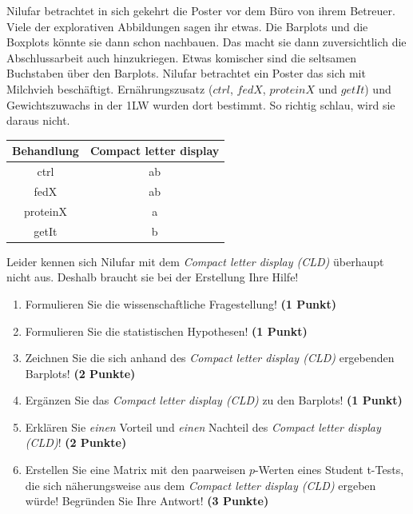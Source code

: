 \documentclass[a4paper, 9pt]{scrartcl}\usepackage[]{graphicx}\usepackage[]{xcolor}
\newenvironment{knitrout}{}{} %
\begin{document}
Nilufar betrachtet in sich gekehrt die Poster vor dem Büro von ihrem Betreuer. Viele der explorativen Abbildungen sagen ihr etwas. Die Barplots und die Boxplots könnte sie dann schon nachbauen. Das macht sie dann zuversichtlich die Abschlussarbeit auch hinzukriegen. Etwas komischer sind die seltsamen Buchstaben über den Barplots. Nilufar betrachtet ein Poster das sich mit Milchvieh beschäftigt. Ernährungszusatz ($ctrl$, $fedX$, $proteinX$ und $getIt$) und Gewichtszuwachs in der 1LW wurden dort bestimmt. So richtig schlau, wird sie daraus nicht.

\begin{knitrout}
\color{fgcolor}\begin{table}[!h]
\centering\begingroup\fontsize{10}{12}\selectfont

\begin{tabular}{cc}
\toprule
\textbf{Behandlung} & \textbf{Compact letter display}\\
\midrule
ctrl & ab\\
fedX & ab\\
proteinX & a\\
getIt & b\\
\bottomrule
\end{tabular}
\endgroup{}
\end{table}

\end{knitrout}

Leider kennen sich Nilufar mit dem \textit{Compact letter display (CLD)} überhaupt nicht aus. Deshalb braucht sie bei der Erstellung Ihre Hilfe!

\begin{enumerate}
  \item Formulieren Sie die wissenschaftliche Fragestellung! \textbf{(1 Punkt)}
  \item Formulieren Sie die statistischen Hypothesen! \textbf{(1 Punkt)}
\item Zeichnen Sie die sich anhand des \textit{Compact letter display (CLD)} ergebenden Barplots! \textbf{(2 Punkte)}
\item Ergänzen Sie das \textit{Compact letter display (CLD)} zu den Barplots! \textbf{(1 Punkt)}
\item Erklären Sie \textit{einen} Vorteil und \textit{einen} Nachteil des \textit{Compact letter display (CLD)}! \textbf{(2 Punkte)}
\item Erstellen Sie eine Matrix mit den paarweisen $p$-Werten eines Student t-Tests, die sich näherungsweise aus dem \textit{Compact letter display (CLD)} ergeben würde! Begründen Sie Ihre Antwort! \textbf{(3 Punkte)}
\end{enumerate}
\end{document}
